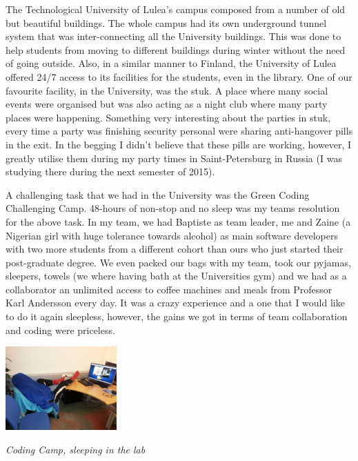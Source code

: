 \documentclass[10pt,a4paper]{article} %
\begin{document}
\begin{multicols}{3}
The Technological University of Lulea's campus composed from a number of old but 
beautiful buildings. 
The whole campus had its own underground tunnel system that was inter-connecting 
all the University buildings. 
This was done to help students from moving to different buildings during winter 
without the need of going outside. 
Also, in a similar manner to Finland, the University of Lulea offered 24/7 access 
to its facilities for the students, even in the library. 
One of our favourite facility, in the University, was the {\sc stuk}. 
A place where many social events were organised but was also acting as a night 
club where many party places were happening.
Something very interesting about the parties in {\sc stuk}, every time a party 
was finishing security personal were sharing anti-hangover pills in the exit. 
In the begging I didn't believe that these pills are working, however, I greatly 
utilise them during my party times in Saint-Petersburg in Russia (I was 
studying there during the next semester of 2015).


A challenging task that we had in the University was the Green Coding Challenging 
Camp.
48-hours of non-stop and no sleep was my teams resolution for the above task. 
In my team, we had Baptiste as team leader, me and Zaine (a Nigerian girl with huge 
tolerance towards alcohol) as main software developers with two more students 
from a different cohort than ours who just started their post-graduate degree.  
We even packed our bags with my team, took our pyjamas, sleepers, towels 
(we where having bath at the Universities gym) and we had as a collaborator an 
unlimited access to coffee machines and meals from Professor Karl Andersson every 
day. 
It was a crazy experience and a one that I would like to do it again sleepless, 
however, the gains we got in terms of team collaboration and coding were 
priceless.


\begin{center}
	\includegraphics[width=0.32\textwidth]{media/coding_camp.jpg}
	\par\textit{Coding Camp, sleeping in the lab}
\end{center}
  


\end{multicols}
\end{document}
